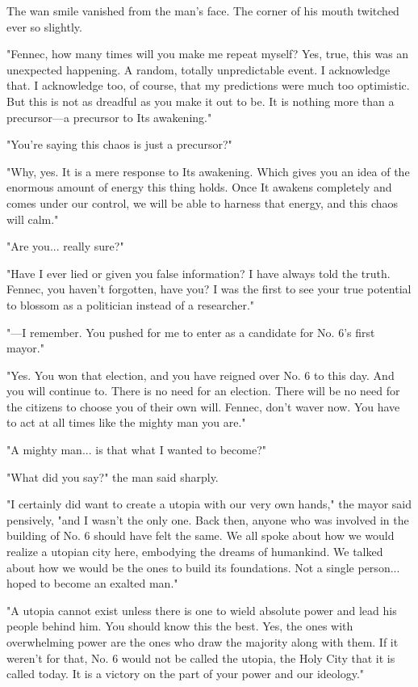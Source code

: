 The wan smile vanished from the man's face. The corner of his mouth
twitched ever so slightly.

"Fennec, how many times will you make me repeat myself? Yes, true, this
was an unexpected happening. A random, totally unpredictable event. I
acknowledge that. I acknowledge too, of course, that my predictions were
much too optimistic. But this is not as dreadful as you make it out to
be. It is nothing more than a precursor---a precursor to Its awakening."

"You're saying this chaos is just a precursor?"

"Why, yes. It is a mere response to Its awakening. Which gives you an
idea of the enormous amount of energy this thing holds. Once It awakens
completely and comes under our control, we will be able to harness that
energy, and this chaos will calm."

"Are you... really sure?"

"Have I ever lied or given you false information? I have always told the
truth. Fennec, you haven't forgotten, have you? I was the first to see
your true potential to blossom as a politician instead of a researcher."

"---I remember. You pushed for me to enter as a candidate for No. 6's
first mayor."

"Yes. You won that election, and you have reigned over No. 6 to this
day. And you will continue to. There is no need for an election. There
will be no need for the citizens to choose you of their own will.
Fennec, don't waver now. You have to act at all times like the mighty
man you are."

"A mighty man... is that what I wanted to become?"

"What did you say?" the man said sharply.

"I certainly did want to create a utopia with our very own hands," the
mayor said pensively, "and I wasn't the only one. Back then, anyone who
was involved in the building of No. 6 should have felt the same. We all
spoke about how we would realize a utopian city here, embodying the
dreams of humankind. We talked about how we would be the ones to build
its foundations. Not a single person... hoped to become an exalted man."

"A utopia cannot exist unless there is one to wield absolute power and
lead his people behind him. You should know this the best. Yes, the ones
with overwhelming power are the ones who draw the majority along with
them. If it weren't for that, No. 6 would not be called the utopia, the
Holy City that it is called today. It is a victory on the part of your
power and our ideology."

